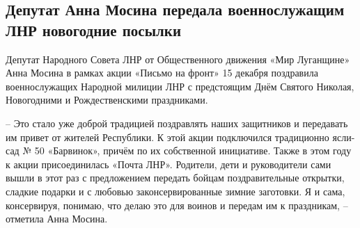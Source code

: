  
 
 
 
 
\subsection{Депутат Анна Мосина передала военнослужащим ЛНР новогодние посылки}
\label{sec:17_12_2021.stz.news.lnr.mirlug.1.podarki_voiny}


Депутат Народного Совета ЛНР от Общественного движения «Мир Луганщине» Анна
Мосина в рамках акции «Письмо на фронт» 15 декабря поздравила военнослужащих
Народной милиции ЛНР с предстоящим Днём Святого Николая, Новогодними и
Рождественскими праздниками.


– Это стало уже доброй традицией поздравлять наших защитников и передавать им
привет от жителей Республики. К этой акции подключился традиционно ясли-сад №
50 «Барвинок», причём по их собственной инициативе. Также в этом году к акции
присоединилась «Почта ЛНР». Родители, дети и руководители сами вышли в этот раз
с предложением передать бойцам поздравительные открытки, сладкие подарки и с
любовью законсервированные зимние заготовки. Я и сама, консервируя, понимаю,
что делаю это для воинов и передам им к праздникам, – отметила Анна Мосина.
